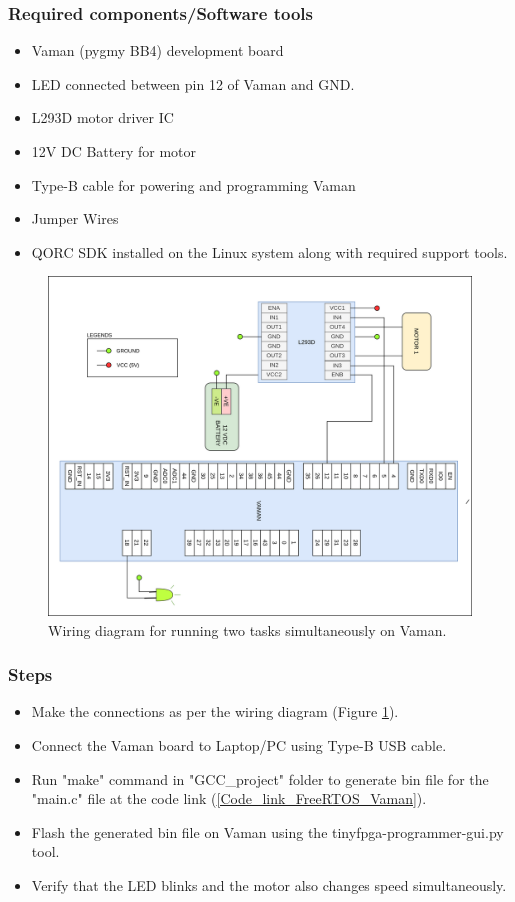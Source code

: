 \subsubsection{Required components/Software tools}
\begin{itemize}
    \item Vaman (pygmy BB4) development board
    \item LED connected between pin 12 of Vaman and GND.
    \item L293D motor driver IC
    \item 12V DC Battery for motor
    \item Type-B cable for powering and programming Vaman
    \item Jumper Wires
    \item QORC SDK installed on the Linux system along with required support tools.
\end{itemize}

\begin{figure}[ht]
\centering
\includegraphics[width=\columnwidth]{./Figures/Wiring_FreeRTOS_demo_vaman.png}
\caption{Wiring diagram for running two tasks simultaneously on Vaman.}
\label{Wiring_FreeRTOS_demo_vaman}
\end{figure}

\subsubsection{Steps}
\begin{itemize}
    \item Make the connections as per the wiring diagram (Figure \ref{Wiring_FreeRTOS_demo_vaman}).
    \item Connect the Vaman board to Laptop/PC using Type-B USB cable.
    \item Run "make" command in "GCC\_project" folder to generate bin file for the "main.c" file at the code link (\ref{Code_link_FreeRTOS_Vaman}).
    \item Flash the generated bin file on Vaman using the tinyfpga-programmer-gui.py tool. 
    \item Verify that the LED blinks and the motor also changes speed simultaneously.
\end{itemize}

